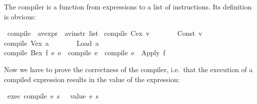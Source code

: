 \begin{isabellebody}
\begin{isamarkuptext}
The compiler is a function from expressions to a list of instructions. Its
definition is obvious:%
\end{isamarkuptext}%
\isamarkuptrue%
\isamarkupfalse%
\ compile\ {}{}\ {}{}{}a{}{}v{}expr\ {}\ {}{}a{}{}v{}instr\ list{}\ \isanewline
{}compile\ {}Cex\ v{}\ \ \ \ \ \ \ {}\ {}Const\ v{}{}\ {}\isanewline
{}compile\ {}Vex\ a{}\ \ \ \ \ \ \ {}\ {}Load\ a{}{}\ {}\isanewline
{}compile\ {}Bex\ f\ e{}\ e{}{}\ {}\ {}compile\ e{}{}\ {}\ {}compile\ e{}{}\ {}\ {}Apply\ f{}{}%
\begin{isamarkuptext}%
Now we have to prove the correctness of the compiler, i.e.\ that the
execution of a compiled expression results in the value of the expression:%
\end{isamarkuptext}%
\isamarkuptrue%
\isamarkupfalse%
\ {}exec\ {}compile\ e{}\ s\ {}{}\ {}\ {}value\ e\ s{}{}%

\end{isabellebody}
